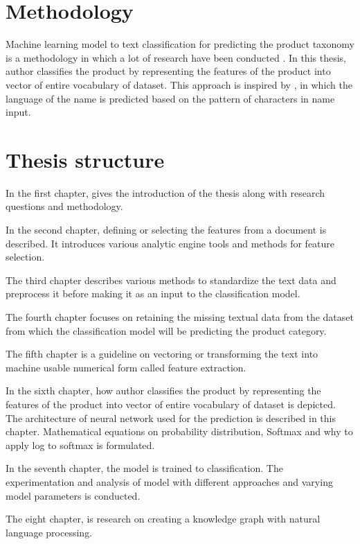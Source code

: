 \section{Methodology}

Machine learning model to text classification for predicting the product taxonomy is a methodology in which a lot of research have been conducted \parencite{AliCevahir.} \parencite{Gupta.20062016}. In this thesis, author classifies the product by representing the features of the product into vector of entire vocabulary of dataset. This approach is inspired by \parencite{sean}, in which the language of the name is predicted based on the pattern of characters in name input. 

\section{Thesis structure}

In the first chapter, gives the introduction of the thesis along with research questions and methodology.

In the second chapter, defining or selecting the features from a document is described. It introduces various analytic engine tools and methods for feature selection. 

The third chapter describes various methods to standardize the text data and preprocess it before making it as an input to the classification model.

The fourth chapter focuses on retaining the missing textual data from the dataset from which the classification model will be predicting the product category. 

The fifth chapter is a guideline on vectoring or transforming the text into machine usable numerical form called feature extraction.

In the sixth chapter, how author classifies the product by representing the features of the product into vector of entire vocabulary of dataset is depicted. The architecture of neural network used for the prediction is described in this chapter. Mathematical equations on probability distribution, Softmax and why to apply log to softmax is formulated. 

In the seventh chapter, the model is trained to classification. The experimentation and analysis of model with different approaches and varying model parameters is conducted.

The eight chapter, is research on creating a knowledge graph with natural language processing.